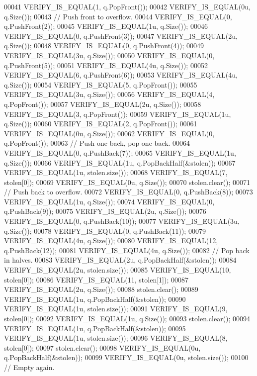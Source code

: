 \begin{DoxyCode}
00041   VERIFY\_IS\_EQUAL(1, q.PopFront());
00042   VERIFY\_IS\_EQUAL(0u, q.Size());
00043   \textcolor{comment}{// Push front to overflow.}
00044   VERIFY\_IS\_EQUAL(0, q.PushFront(2));
00045   VERIFY\_IS\_EQUAL(1u, q.Size());
00046   VERIFY\_IS\_EQUAL(0, q.PushFront(3));
00047   VERIFY\_IS\_EQUAL(2u, q.Size());
00048   VERIFY\_IS\_EQUAL(0, q.PushFront(4));
00049   VERIFY\_IS\_EQUAL(3u, q.Size());
00050   VERIFY\_IS\_EQUAL(0, q.PushFront(5));
00051   VERIFY\_IS\_EQUAL(4u, q.Size());
00052   VERIFY\_IS\_EQUAL(6, q.PushFront(6));
00053   VERIFY\_IS\_EQUAL(4u, q.Size());
00054   VERIFY\_IS\_EQUAL(5, q.PopFront());
00055   VERIFY\_IS\_EQUAL(3u, q.Size());
00056   VERIFY\_IS\_EQUAL(4, q.PopFront());
00057   VERIFY\_IS\_EQUAL(2u, q.Size());
00058   VERIFY\_IS\_EQUAL(3, q.PopFront());
00059   VERIFY\_IS\_EQUAL(1u, q.Size());
00060   VERIFY\_IS\_EQUAL(2, q.PopFront());
00061   VERIFY\_IS\_EQUAL(0u, q.Size());
00062   VERIFY\_IS\_EQUAL(0, q.PopFront());
00063   \textcolor{comment}{// Push one back, pop one back.}
00064   VERIFY\_IS\_EQUAL(0, q.PushBack(7));
00065   VERIFY\_IS\_EQUAL(1u, q.Size());
00066   VERIFY\_IS\_EQUAL(1u, q.PopBackHalf(&stolen));
00067   VERIFY\_IS\_EQUAL(1u, stolen.size());
00068   VERIFY\_IS\_EQUAL(7, stolen[0]);
00069   VERIFY\_IS\_EQUAL(0u, q.Size());
00070   stolen.clear();
00071   \textcolor{comment}{// Push back to overflow.}
00072   VERIFY\_IS\_EQUAL(0, q.PushBack(8));
00073   VERIFY\_IS\_EQUAL(1u, q.Size());
00074   VERIFY\_IS\_EQUAL(0, q.PushBack(9));
00075   VERIFY\_IS\_EQUAL(2u, q.Size());
00076   VERIFY\_IS\_EQUAL(0, q.PushBack(10));
00077   VERIFY\_IS\_EQUAL(3u, q.Size());
00078   VERIFY\_IS\_EQUAL(0, q.PushBack(11));
00079   VERIFY\_IS\_EQUAL(4u, q.Size());
00080   VERIFY\_IS\_EQUAL(12, q.PushBack(12));
00081   VERIFY\_IS\_EQUAL(4u, q.Size());
00082   \textcolor{comment}{// Pop back in halves.}
00083   VERIFY\_IS\_EQUAL(2u, q.PopBackHalf(&stolen));
00084   VERIFY\_IS\_EQUAL(2u, stolen.size());
00085   VERIFY\_IS\_EQUAL(10, stolen[0]);
00086   VERIFY\_IS\_EQUAL(11, stolen[1]);
00087   VERIFY\_IS\_EQUAL(2u, q.Size());
00088   stolen.clear();
00089   VERIFY\_IS\_EQUAL(1u, q.PopBackHalf(&stolen));
00090   VERIFY\_IS\_EQUAL(1u, stolen.size());
00091   VERIFY\_IS\_EQUAL(9, stolen[0]);
00092   VERIFY\_IS\_EQUAL(1u, q.Size());
00093   stolen.clear();
00094   VERIFY\_IS\_EQUAL(1u, q.PopBackHalf(&stolen));
00095   VERIFY\_IS\_EQUAL(1u, stolen.size());
00096   VERIFY\_IS\_EQUAL(8, stolen[0]);
00097   stolen.clear();
00098   VERIFY\_IS\_EQUAL(0u, q.PopBackHalf(&stolen));
00099   VERIFY\_IS\_EQUAL(0u, stolen.size());
00100   \textcolor{comment}{// Empty again.}

\end{DoxyCode}
